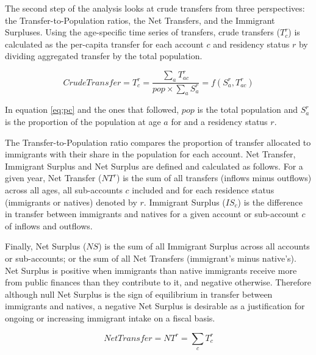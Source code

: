 \vspace{0.7em}\par
The second step of the analysis looks at crude transfers from three perspectives: the Transfer-to-Population ratios, the Net Transfers, and the Immigrant Surpluses.
Using the age-specific time series of transfers, crude transfers (\(T^{r}_c \)) is calculated as the per-capita transfer for each account \(c \) and residency status \(r\) by dividing aggregated transfer by the total population.

\begin{equation}\label{eq:pc}
  Crude Transfer=T^{r}_c= \frac{\displaystyle\sum_{a}T^{r}_{ac} }{ pop \times \displaystyle\sum_{a} S^{r}_a}=f(S^{r}_a, T^{r}_{ac})
\end{equation}

In equation \eqref{eq:pc} and the ones that followed, \(pop\) is the total population and \(S^{r}_a\) is the proportion of the population at age \(a\) for and a residency status \(r\).

\vspace{0.7em}\par
The Transfer-to-Population ratio compares the proportion of transfer allocated to immigrants with their share in the population for each account.
Net Transfer, Immigrant Surplus and Net Surplus are defined and calculated as follows.
For a given year, Net Transfer (\(NT^{r}\)) is the sum of all transfers (inflows minus outflows) across all ages, all sub-accounts \(c \) included and for each residence status (immigrants or natives) denoted by \(r \).
Immigrant Surplus (\(IS_{c}\)) is the difference in transfer between immigrants and natives for a given account or sub-account \(c \) of inflows and outflows.

\vspace{0.7em}\par
Finally, Net Surplus (\( NS \)) is the sum of all Immigrant Surplus across all accounts or sub-accounts; or the sum of all Net Transfers (immigrant's minus native's).
Net Surplus is positive when immigrants than native immigrants receive more from public finances than they contribute to it, and negative otherwise.
Therefore although null Net Surplus is the sign of equilibrium in transfer between immigrants and natives, a negative Net Surplus is desirable as a justification for ongoing or increasing immigrant intake on a fiscal basis.

\begin{equation}\label{eq:nt}
  Net Transfer=NT^{r}= \displaystyle\sum_{c}T^{r}_{c}
\end{equation}

